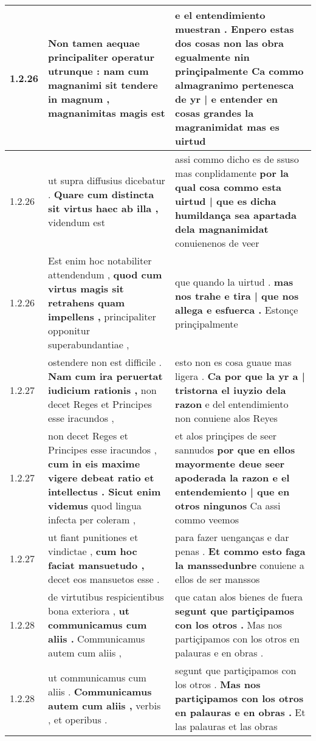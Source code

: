 \begin{tabular}{|p{1cm}|p{6.5cm}|p{6.5cm}|}
1.2.26 & Non tamen aequae principaliter operatur utrunque : \textbf{ nam cum magnanimi sit tendere in magnum , } magnanimitas magis est & e el entendimiento muestran . Enpero estas dos cosas non las obra egualmente nin prinçipalmente \textbf{ Ca commo almagranimo pertenesca de yr | e entender en cosas grandes la magranimidat } mas es uirtud \\\hline
1.2.26 & ut supra diffusius dicebatur . \textbf{ Quare cum distincta sit virtus haec ab illa , } videndum est & assi commo dicho es de ssuso mas conplidamente \textbf{ por la qual cosa commo esta uirtud | que es dicha humildança sea apartada dela magnanimidat } conuienenos de veer \\\hline
1.2.26 & Est enim hoc notabiliter attendendum , \textbf{ quod cum virtus magis sit retrahens quam impellens , } principaliter opponitur superabundantiae , & que quando la uirtud . \textbf{ mas nos trahe e tira | que nos allega e esfuerca . } Estonçe prinçipalmente \\\hline
1.2.27 & ostendere non est difficile . \textbf{ Nam cum ira peruertat iudicium rationis , } non decet Reges et Principes esse iracundos , & esto non es cosa guaue mas ligera . \textbf{ Ca por que la yr a | tristorna el iuyzio dela razon } e del entendimiento non conuiene alos Reyes \\\hline
1.2.27 & non decet Reges et Principes esse iracundos , \textbf{ cum in eis maxime vigere debeat ratio et intellectus . Sicut enim videmus } quod lingua infecta per coleram , & et alos prinçipes de seer sannudos \textbf{ por que en ellos mayormente deue seer apoderada la razon e el entendemiento | que en otros ningunos } Ca assi commo veemos \\\hline
1.2.27 & ut fiant punitiones et vindictae , \textbf{ cum hoc faciat mansuetudo , } decet eos mansuetos esse . & para fazer uenganças e dar penas . \textbf{ Et commo esto faga la manssedunbre } conuiene a ellos de ser manssos \\\hline
1.2.28 & de virtutibus respicientibus bona exteriora , \textbf{ ut communicamus cum aliis . } Communicamus autem cum aliis , & que catan alos bienes de fuera \textbf{ segunt que partiçipamos con los otros . } Mas nos partiçipamos con los otros en palauras e en obras . \\\hline
1.2.28 & ut communicamus cum aliis . \textbf{ Communicamus autem cum aliis , } verbis , et operibus . & segunt que partiçipamos con los otros . \textbf{ Mas nos partiçipamos con los otros en palauras e en obras . } Et las palauras et las obras \\\hline

\end{tabular}
